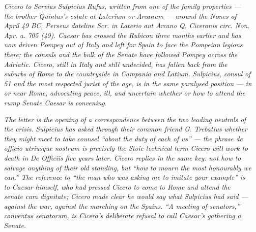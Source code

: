 
\textit{Cicero to Servius Sulpicius Rufus, written from one of
the family properties --- the brother Quintus's estate at
Laterium or Arcanum --- around the Nones of April 49 BC,
Perseus dateline \textit{Scr. in Laterio aut Arcano Q. Ciceronis
circ. Non. Apr. a. 705 (49)}. Caesar has crossed the Rubicon
three months earlier and has now driven Pompey out of Italy and
left for Spain to face the Pompeian legions there; the consuls
and the bulk of the Senate have followed Pompey across the
Adriatic. Cicero, still in Italy and still undecided, has fallen
back from the suburbs of Rome to the countryside in Campania
and Latium. Sulpicius, consul of 51 and the most respected
jurist of the age, is in the same paralysed position --- in or
near Rome, advocating peace, ill, and uncertain whether or how
to attend the rump Senate Caesar is convening.}

\textit{The letter is the opening of a correspondence between
the two leading neutrals of the crisis. Sulpicius has asked
through their common friend G. Trebatius whether they might
meet to take counsel ``about the duty of each of us'' --- the
phrase \textit{de officio utriusque nostrum} is precisely the
Stoic technical term Cicero will work to death in De Officiis
five years later. Cicero replies in the same key: not how to
salvage anything of their old standing, but ``how to mourn the
most honourably we can.'' The reference to ``the man who was
asking me to imitate your example'' is to Caesar himself, who
had pressed Cicero to come to Rome and attend the senate
\textit{cum dignitate}; Cicero made clear he would say what
Sulpicius had said --- against the war, against the marching on
the Spains. ``A meeting of senators,'' \textit{conventus
senatorum}, is Cicero's deliberate refusal to call Caesar's
gathering a Senate.}
